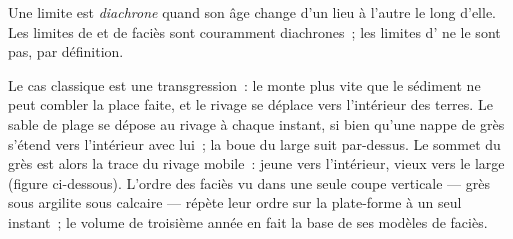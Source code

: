 \begin{definition}\label{def:b1:stratigraphic-scale:diachronous}
Une limite est \emph{diachrone} quand son âge
change d'un lieu à l'autre le long d'elle. Les limites de  et de
faciès sont couramment diachrones~; les limites d'
ne le sont pas, par définition.
\end{definition}

Le cas classique est une transgression~: le  monte plus vite que le
sédiment ne peut combler la place faite, et le rivage se déplace vers l'intérieur des terres. Le sable de plage
se dépose au rivage à chaque instant, si bien qu'une nappe de grès s'étend
vers l'intérieur avec lui~; la boue du large suit par-dessus. Le sommet du grès est
alors la trace du rivage mobile~: jeune vers l'intérieur, vieux vers le large
(figure ci-dessous). L'ordre des faciès vu dans une seule coupe verticale --- grès
sous argilite sous calcaire --- répète leur ordre sur la plate-forme à un seul
instant~; le volume de troisième année en fait la base de ses modèles de faciès.

